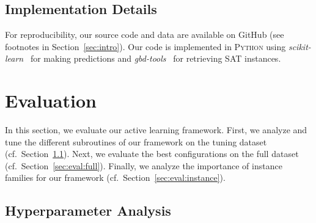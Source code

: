 \documentclass[sn-basic, Numbered]{sn-jnl} %
\begin{document}
\subsection{Implementation Details}
\label{sec:exdesign:impl}

For reproducibility, our source code and data are available on GitHub (see footnotes in Section~\ref{sec:intro}).
Our code is implemented in \textsc{Python} using \emph{scikit-learn}~\cite{scikit-learn} for making predictions and \emph{gbd-tools}~\cite{IserS18} for retrieving SAT instances.


\section{Evaluation}
\label{sec:eval}

In this section, we evaluate our active learning framework.
First, we analyze and tune the different subroutines of our framework on the tuning dataset (cf.~Section~\ref{sec:eval:hyper}).
Next, we evaluate the best configurations on the full dataset (cf.~Section~\ref{sec:eval:full}).
Finally, we analyze the importance of instance families for our framework (cf.~Section~\ref{sec:eval:instance}).

\subsection{Hyperparameter Analysis}
\label{sec:eval:hyper}
\end{document}
